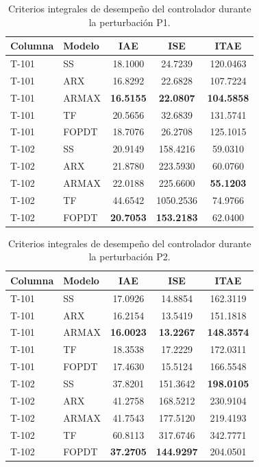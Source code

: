 \begin{table}[htbp]
\centering
\caption{Criterios integrales de desempeño del controlador durante la perturbación P1.}
\label{tab:ControlIntegralesP1}
\small
\begin{tabular}{llccc}
\toprule
Columna & Modelo & IAE & ISE & ITAE \\
\midrule
T-101 & SS     & 18.1000 & 24.7239 & 120.0463 \\
T-101 & ARX    & 16.8292 & 22.6828 & 107.7224 \\
T-101 & ARMAX  & \textbf{16.5155} & \textbf{22.0807} & \textbf{104.5858} \\
T-101 & TF     & 20.5656 & 32.6839 & 131.5741 \\
T-101 & FOPDT  & 18.7076 & 26.2708 & 125.1015 \\
\midrule
T-102 & SS     & 20.9149 & 158.4216 & 59.0310 \\
T-102 & ARX    & 21.8780 & 223.5930 & 60.0760 \\
T-102 & ARMAX  & 22.0188 & 225.6600 & \textbf{55.1203} \\
T-102 & TF     & 44.6542 & 1050.2536 & 74.9766 \\
T-102 & FOPDT  & \textbf{20.7053} & \textbf{153.2183} & 62.0400 \\
\bottomrule
\end{tabular}
\end{table}

\begin{table}[htbp]
\centering
\caption{Criterios integrales de desempeño del controlador durante la perturbación P2.}
\label{tab:ControlIntegralesP2}
\small
\begin{tabular}{llccc}
\toprule
Columna & Modelo & IAE & ISE & ITAE \\
\midrule
T-101 & SS     & 17.0926 & 14.8854 & 162.3119 \\
T-101 & ARX    & 16.2154 & 13.5419 & 151.1818 \\
T-101 & ARMAX  & \textbf{16.0023} & \textbf{13.2267} & \textbf{148.3574} \\
T-101 & TF     & 18.3538 & 17.2229 & 172.0311 \\
T-101 & FOPDT  & 17.4630 & 15.5124 & 166.5548 \\
\midrule
T-102 & SS     & 37.8201 & 151.3642 & \textbf{198.0105} \\
T-102 & ARX    & 41.2758 & 168.5212 & 230.9104 \\
T-102 & ARMAX  & 41.7543 & 177.5120 & 219.4193 \\
T-102 & TF     & 60.8113 & 317.6746 & 342.7771 \\
T-102 & FOPDT  & \textbf{37.2705} & \textbf{144.9297} & 204.0501 \\
\bottomrule
\end{tabular}
\end{table}

